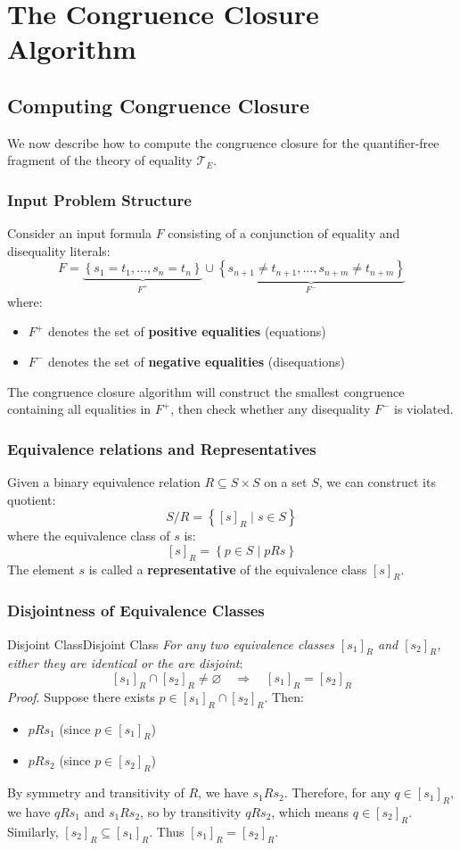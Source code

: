 \documentclass[a4paper]{article}
\theoremstyle{definition}
\begin{document}
\section{The Congruence Closure Algorithm}
\subsection{Computing Congruence Closure}
We now describe how to compute the congruence closure for the quantifier-free fragment of the theory 
of equality \( \mathcal{T}_{E} \).
\subsubsection{Input Problem Structure}
Consider an input formula \( F \) consisting of a conjunction of equality and disequality literals:
\[
  F = \underbrace{\left\{ s_1 = t_1, \ldots, s_n = t_n \right\}}_{F^+} \cup \underbrace{\left\{s_{n + 1} \neq t_{n + 1}, \ldots, s_{n + m} \neq t_{n + m} \right\}}_{F^-}
\]
where:
\begin{itemize}
	\item \( F^+ \) denotes the set of \textbf{positive equalities} (equations)
	\item \( F^- \) denotes the set of \textbf{negative equalities} (disequations)
\end{itemize}
The congruence closure algorithm will construct the smallest congruence containing all equalities in \( F^+ \),
then check whether any disequality \( F^- \) is violated.
\subsubsection{Equivalence relations and Representatives}
Given a binary equivalence relation \( R \subseteq S \times S \) on a set \( S \), we can construct its quotient:
\[
  S/R = \left\{ [s]_R \;|\; s \in S \right\}
\]
where the equivalence class of \( s \) is:
\[
  [s]_R = \left\{ p \in S \;|\; pRs \right\}
\]
The element \( s \) is called a \textbf{representative} of the equivalence class \( [s]_R \).
\subsubsection{Disjointness of Equivalence Classes}
\begin{definition}{Disjoint Class}{Disjoint Class}
\textit{For any two equivalence classes \( [s_1]_R \) and \( [s_2]_R \), either they are identical or the 
are disjoint}:
\[
  [s_1]_R \cap [s_2]_R \neq \varnothing \quad \Rightarrow \quad [s_1]_R = [s_2]_R
\]
\textit{Proof}. Suppose there exists \( p \in [s_1]_R \cap [s_2]_R \). Then:
\begin{itemize}
	\item \( p R s_1 \) (since \( p \in [s_1]_R \))
	\item \( p R s_2 \) (since \( p \in [s_2]_R \))
\end{itemize}
\end{definition}
By symmetry and transitivity of \( R \), we have \( s_1 R s_2 \). Therefore, for any \( q \in [s_1]_R \), we have \( q R s_1 \) and
\( s_1 R s_2 \), so by transitivity \( q R s_2 \), which means \( q \in [s_2]_R \). Similarly, \( [s_2]_R \subseteq [s_1]_R \). Thus 
\( [s_1]_R = [s_2]_R \).
\end{document}
